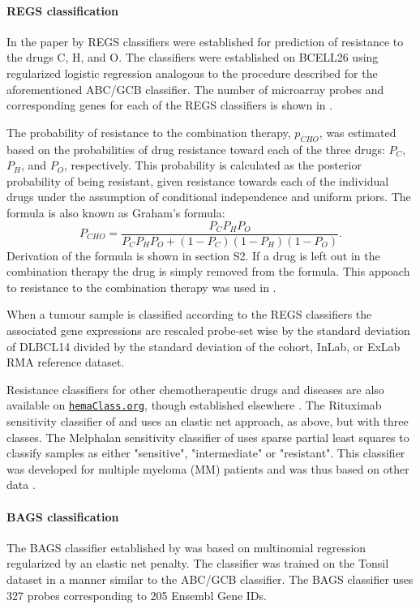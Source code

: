 \documentclass[10pt,letterpaper]{article}
\newcommand{\hemaClass}{\href{http://hemaClass.org}{\texttt{hemaClass.org}}}
\begin{document}
\paragraph{REGS classification}
\label{sec:regsmethods}
In the paper by \cite{Falgreen2015} REGS classifiers were established for prediction of resistance to the drugs C, H, and O.
The classifiers were established on BCELL26 using regularized logistic regression analogous to the procedure described for the aforementioned ABC/GCB classifier. The number of microarray probes and corresponding genes for each of the REGS classifiers is shown in .

The probability of resistance to the combination therapy, $p_{CHO}$, was estimated based on the probabilities of drug resistance toward each of the three drugs: $P_C$, $P_H$, and $P_O$, respectively.
This probability is calculated as the posterior probability of being resistant, given resistance towards each of the individual drugs under the assumption of conditional independence and uniform priors.
The formula is also known as Graham's formula:
\begin{equation*}
P_{CHO} = \frac{P_C P_H P_O}{P_C P_H P_O + (1 - P_C)(1 - P_H)(1 - P_O)}.
\end{equation*}
Derivation of the formula is shown in  section S2.
If a drug is left out in the combination therapy the drug is simply removed from the formula.
This appoach to resistance to the combination therapy was used in \cite{Falgreen2015}.

When a tumour sample is classified according to the REGS classifiers the associated gene expressions are rescaled probe-set wise by the standard deviation of DLBCL14 divided by the standard deviation of the cohort, InLab, or ExLab RMA reference dataset.

Resistance classifiers for other chemotherapeutic drugs and diseases are also available on \hemaClass{}, though established elsewhere \cite{Boegsted2011,Bogsted2013,Laursen2014}.
The Rituximab sensitivity classifier of \cite{Laursen2014} and \cite{Laursen2015} uses an elastic net approach, as above, but with three classes.
The Melphalan sensitivity classifier of \cite{Boegsted2011} uses sparse partial least squares to classify samples as either "sensitive", "intermediate" or "resistant". This classifier was developed for multiple myeloma (MM) patients and was thus based on other data \cite{Boegsted2011}.


\paragraph{BAGS classification}
The BAGS classifier established by \cite{DybkaerBoegsted2015} was based on multinomial regression regularized by an elastic net penalty.
The classifier was trained on the Tonsil dataset in a manner similar to the ABC/GCB classifier. The BAGS classifier uses 327 probes corresponding to 205 Ensembl Gene IDs.
\end{document}
